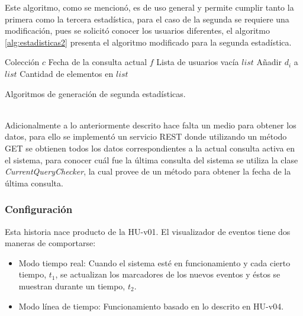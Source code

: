 Este algoritmo, como se mencionó, es de uso general y permite cumplir tanto la primera como la tercera estadística, para el caso de la segunda se requiere una modificación, pues se solicitó conocer los usuarios diferentes, el algoritmo \ref{alg:estadisticas2} presenta el algoritmo modificado para la segunda estadística.\\

\begin{algorithm}[H]
	\begin{algorithmic}
		\REQUIRE Colección $c$ 
		\REQUIRE Fecha de la consulta actual $f$ 
		\ENSURE Lista de usuarios vacía $list$  
					\STATE Añadir $d_{i}$ a $list$
				\ENDIF
			\ENDIF	
		\ENDFOR
		\RETURN Cantidad de elementos en $list$
	\end{algorithmic}
	\caption{Algoritmos de generación de segunda estadísticas.}
	\label{alg:estadisticas2}
\end{algorithm}\vphantom\\

Adicionalmente a lo anteriormente descrito hace falta un medio para obtener los datos, para ello se implementó un servicio REST donde utilizando un método GET se obtienen todos los datos correspondientes a la actual consulta activa en el sistema, para conocer cuál fue la última consulta del sistema se utiliza la clase \textit{CurrentQueryChecker}, la cual provee de un método para obtener la fecha de la última consulta.

\subsubsection*{Configuración}
\label{subsubsec:config}

Esta historia nace producto de la HU-v01. El visualizador de eventos tiene dos maneras de comportarse:

\begin{itemize}
\item Modo tiempo real: Cuando el sistema esté en funcionamiento y cada cierto tiempo, $t_{1}$, se actualizan los marcadores de los nuevos eventos y éstos se muestran durante un tiempo, $t_{2}$.
\item Modo línea de tiempo: Funcionamiento basado en lo descrito en HU-v04.
\end{itemize}

